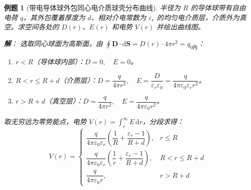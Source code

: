 \documentclass[11pt,a4paper,fontset=fandol]{ctexart}
\newtheorem{example}{例题}[section]
\theoremstyle{remark}
\begin{document}
\begin{example}[带电导体球外包同心电介质球壳分布曲线]
半径为 $R$ 的导体球带有自由电荷 $q$，其外包覆着厚度为 $d$、相对介电常数为 $\varepsilon_r$ 的均匀电介质层，介质外为真空。求空间各处的 $D(r)$、$E(r)$ 和电势 $V(r)$ 并绘出曲线图。

\textbf{解}：
选取同心球面为高斯面，由 $\oint \bm{D}\cdot\mathrm{d}\bm{S} = D(r) \cdot 4\pi r^2 = q_{0\text{内}}$：
\begin{enumerate}
    \item $r < R$（导体球内部）：$D = 0, \quad E = 0$。
    \item $R < r \le R+d$（介质层）：$D = \dfrac{q}{4\pi r^2}, \quad E = \dfrac{D}{\varepsilon_r \varepsilon_0} = \dfrac{q}{4\pi\varepsilon_0\varepsilon_r r^2}$。
    \item $r > R+d$（真空层）：$D = \dfrac{q}{4\pi r^2}, \quad E = \dfrac{q}{4\pi\varepsilon_0 r^2}$。
\end{enumerate}
取无穷远为零势能点，电势 $V(r) = \int_r^\infty E\,\mathrm{d}r$，分段求得：
\begin{equation*}
    V(r) = \begin{cases}
        \dfrac{q}{4\pi\varepsilon_0\varepsilon_r}\left( \dfrac{1}{R} + \dfrac{\varepsilon_r - 1}{R+d} \right), & r \le R \\[2mm]
        \dfrac{q}{4\pi\varepsilon_0\varepsilon_r}\left( \dfrac{1}{r} + \dfrac{\varepsilon_r - 1}{R+d} \right), & R < r \le R+d \\[2mm]
        \dfrac{q}{4\pi\varepsilon_0 r}, & r > R+d
    \end{cases}
\end{equation*}

\begin{center}
\end{center}
\end{example}
\end{document}
